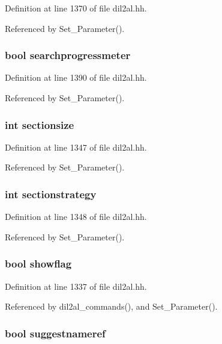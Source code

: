 Definition at line 1370 of file dil2al.hh.

Referenced by Set\_\-Parameter().
\subsubsection{\setlength{\rightskip}{0pt plus 5cm}bool searchprogressmeter}\label{dil2al_8hh_a196}




Definition at line 1390 of file dil2al.hh.

Referenced by Set\_\-Parameter().
\subsubsection{\setlength{\rightskip}{0pt plus 5cm}int sectionsize}\label{dil2al_8hh_a153}




Definition at line 1347 of file dil2al.hh.

Referenced by Set\_\-Parameter().
\subsubsection{\setlength{\rightskip}{0pt plus 5cm}int sectionstrategy}\label{dil2al_8hh_a154}




Definition at line 1348 of file dil2al.hh.

Referenced by Set\_\-Parameter().
\subsubsection{\setlength{\rightskip}{0pt plus 5cm}bool showflag}\label{dil2al_8hh_a140}




Definition at line 1337 of file dil2al.hh.

Referenced by dil2al\_\-commands(), and Set\_\-Parameter().
\subsubsection{\setlength{\rightskip}{0pt plus 5cm}bool suggestnameref}\label{dil2al_8hh_a136}




